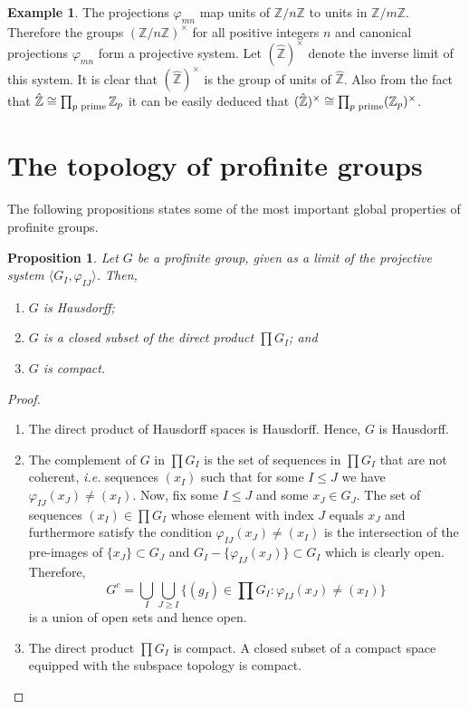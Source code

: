 \documentclass[12pt]{article}
\newtheorem{prop}[thm]{Proposition}
\theoremstyle{definition}
\newtheorem{exm}[thm]{Example}
\theoremstyle{remark}
\newcommand{\zee}{\mathbb{Z}}
\newcommand{\zeehat}{\hat{\mathbb{Z}}}
\begin{document}
    \begin{exm}
        The projections $\varphi_{mn}$ map units of $\zee/n\zee$ to units in $\zee/m\zee$. Therefore the groups $(\zee/n\zee)^\times$ for all positive integers $n$ and canonical projections $\varphi_{mn}$ form a projective system. Let $(\zeehat)^\times$ denote the inverse limit of this system. It is clear that $(\zeehat)^\times$ is the group of units of $\zeehat$. Also from the fact that $\zeehat\cong\prod_{p\textup{ prime}}\zee_p$ it can be easily deduced that $(\zeehat)^\times\cong\prod_{p \textup{ prime}}(\zee_p)^\times$.
    \end{exm}

    \section{The topology of profinite groups}
    
    The following propositions states some of the most important global properties of profinite groups.

    \begin{prop}\label{prop:top}
        Let $G$ be a profinite group, given as a limit of the projective system $\langle G_I,\varphi_{IJ}\rangle$. Then,
        \begin{enumerate}[label=(\alph*)]
            \item $G$ is Hausdorff;
            \item $G$ is a closed subset of the direct product $\prod G_I$; and
            \item\label{prop:top:compact} $G$ is compact.
        \end{enumerate}
    \end{prop}
    \begin{proof}
        \begin{enumerate}[label=(\alph*)]
            \item The direct product of Hausdorff spaces is Hausdorff. Hence, $G$ is Hausdorff.
            \item The complement of $G$ in $\prod G_I$ is the set of sequences in $\prod G_I$ that are not coherent, \emph{i.e.} sequences $(x_I)$ such that for some $I\leq J$ we have $\varphi_{IJ}(x_J)\neq(x_I)$. Now, fix some $I\leq J$ and some $x_J\in G_J$. The set of sequences $(x_I)\in\prod G_I$ whose element with index $J$ equals $x_J$ and furthermore satisfy the condition $\varphi_{IJ}(x_J)\neq(x_I)$ is the intersection of the pre-images of $\{x_J\}\subset G_J$ and $G_I - \{\varphi_{IJ}(x_J)\}\subset G_I$ which is clearly open. Therefore,
            $$
            G^c=\bigcup_I\bigcup_{J\geq I}\{(g_I)\in\prod G_I:\varphi_{IJ}(x_J)\neq(x_I)\}
            $$
            is a union of open sets and hence open.
            \item The direct product $\prod G_I$ is compact. A closed subset of a compact space equipped with the subspace topology is compact.
        \end{enumerate}
    \end{proof}
\end{document}
